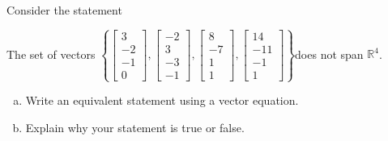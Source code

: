 
\begin{exerciseStatement}


Consider the statement 
\begin{center}\begin{minipage}{0.8\textwidth}
 The set of vectors \( \left\{ \left[\begin{array}{c}
3 \\
-2 \\
-1 \\
0
\end{array}\right] , \left[\begin{array}{c}
-2 \\
3 \\
-3 \\
-1
\end{array}\right] , \left[\begin{array}{c}
8 \\
-7 \\
1 \\
1
\end{array}\right] , \left[\begin{array}{c}
14 \\
-11 \\
-1 \\
1
\end{array}\right] \right\} \)does not span \(\mathbb{R}^4\). 
\end{minipage}\end{center}
    


\begin{enumerate}[(a)]
\item  Write an equivalent statement using a vector equation.
\item  Explain why your statement is true or false.
\end{enumerate}
    
\end{exerciseStatement}
    
